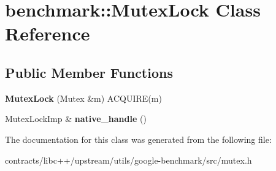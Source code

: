 \hypertarget{classbenchmark_1_1_mutex_lock}{}\section{benchmark\+:\+:Mutex\+Lock Class Reference}
\label{classbenchmark_1_1_mutex_lock}
\subsection*{Public Member Functions}
\begin{DoxyCompactItemize}
\item 
\mbox{\label{classbenchmark_1_1_mutex_lock_a5be768880cd7de97772fc42d51eba067}} 
{\bfseries Mutex\+Lock} (Mutex \&m) A\+C\+Q\+U\+I\+RE(m)
\item 
\mbox{\label{classbenchmark_1_1_mutex_lock_a89bec41e98c16a90ccd3e52cda9a39ab}} 
Mutex\+Lock\+Imp \& {\bfseries native\+\_\+handle} ()
\end{DoxyCompactItemize}


The documentation for this class was generated from the following file\+:\begin{DoxyCompactItemize}
\item 
contracts/libc++/upstream/utils/google-\/benchmark/src/mutex.\+h\end{DoxyCompactItemize}

